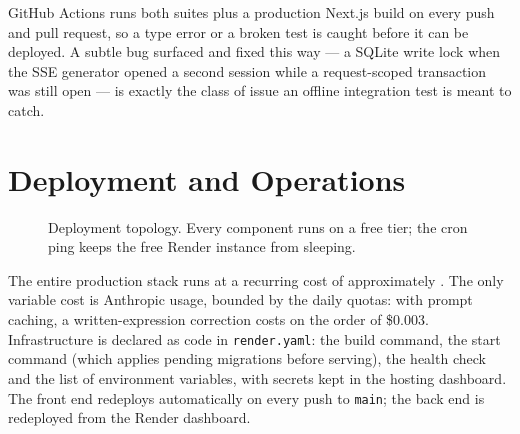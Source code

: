 \documentclass[11pt,a4paper]{article}
\begin{document}
GitHub Actions runs both suites plus a production Next.js build on every push
and pull request, so a type error or a broken test is caught before it can be
deployed. A subtle bug surfaced and fixed this way --- a SQLite write lock when
the SSE generator opened a second session while a request-scoped transaction
was still open --- is exactly the class of issue an offline integration test is
meant to catch.

\section{Deployment and Operations}

\begin{figure}[h]
\centering
{}
\caption{Deployment topology. Every component runs on a free tier; the cron
ping keeps the free Render instance from sleeping.}
\end{figure}

\noindent The entire production stack runs at a recurring cost of
approximately \textbf{}. The only variable cost is Anthropic usage,
bounded by the daily quotas: with prompt caching, a written-expression
correction costs on the order of \$0.003. Infrastructure is declared as code in
\texttt{render.yaml}: the build command, the start command (which applies
pending migrations before serving), the health check and the list of
environment variables, with secrets kept in the hosting dashboard. The front
end redeploys automatically on every push to \texttt{main}; the back end is
redeployed from the Render dashboard.
\end{document}
